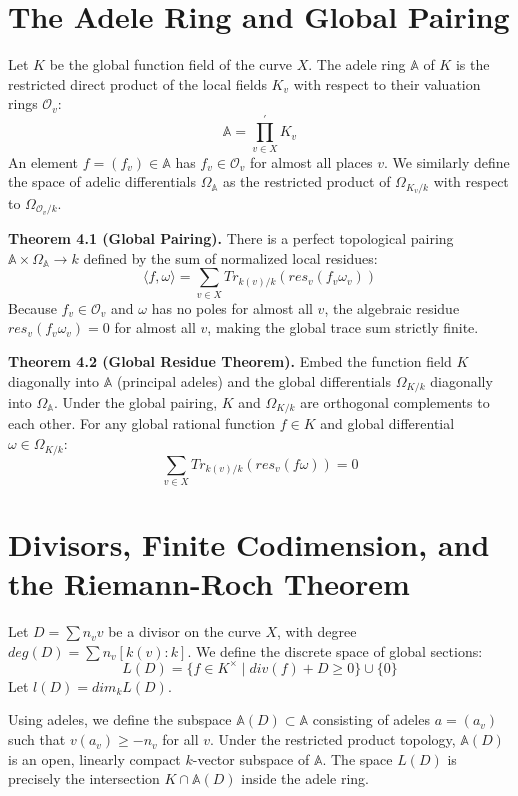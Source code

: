\documentclass[12pt]{article}
\begin{document}
\section{The Adele Ring and Global Pairing}

Let $K$ be the global function field of the curve $X$. The adele ring $\mathbb{A}$ of $K$ is the restricted direct product of the local fields $K_{v}$ with respect to their valuation rings $\mathcal{O}_{v}$:
$$\mathbb{A}=\prod_{v\in X}^{\prime}K_{v}$$
An element $f=(f_{v})\in\mathbb{A}$ has $f_{v}\in\mathcal{O}_{v}$ for almost all places $v$. We similarly define the space of adelic differentials $\Omega_{\mathbb{A}}$ as the restricted product of $\Omega_{K_{v}/k}$ with respect to $\Omega_{\mathcal{O}_{v}/k}$.

\textbf{Theorem 4.1 (Global Pairing).} There is a perfect topological pairing $\mathbb{A}\times\Omega_{\mathbb{A}}\rightarrow k$ defined by the sum of normalized local residues:
$$\langle f,\omega\rangle=\sum_{v\in X}Tr_{k(v)/k}(res_{v}(f_{v}\omega_{v}))$$
Because $f_{v}\in\mathcal{O}_{v}$ and $\omega$ has no poles for almost all $v$, the algebraic residue $res_{v}(f_{v}\omega_{v})=0$ for almost all $v$, making the global trace sum strictly finite.

\textbf{Theorem 4.2 (Global Residue Theorem).} Embed the function field $K$ diagonally into $\mathbb{A}$ (principal adeles) and the global differentials $\Omega_{K/k}$ diagonally into $\Omega_{\mathbb{A}}$. Under the global pairing, $K$ and $\Omega_{K/k}$ are orthogonal complements to each other. For any global rational function $f\in K$ and global differential $\omega\in\Omega_{K/k}$:
$$\sum_{v\in X}Tr_{k(v)/k}(res_{v}(f\omega))=0$$

\section{Divisors, Finite Codimension, and the Riemann-Roch Theorem}

Let $D=\sum n_{v}v$ be a divisor on the curve $X$, with degree $deg(D)=\sum n_{v}[k(v):k]$. We define the discrete space of global sections:
$$L(D)=\{f\in K^{\times} \mid div(f)+D\ge0\}\cup\{0\}$$
Let $l(D)=dim_{k}L(D)$.

Using adeles, we define the subspace $\mathbb{A}(D)\subset\mathbb{A}$ consisting of adeles $a=(a_{v})$ such that $v(a_{v})\ge-n_{v}$ for all $v$. Under the restricted product topology, $\mathbb{A}(D)$ is an open, linearly compact $k$-vector subspace of $\mathbb{A}$. The space $L(D)$ is precisely the intersection $K\cap\mathbb{A}(D)$ inside the adele ring.
\end{document}
